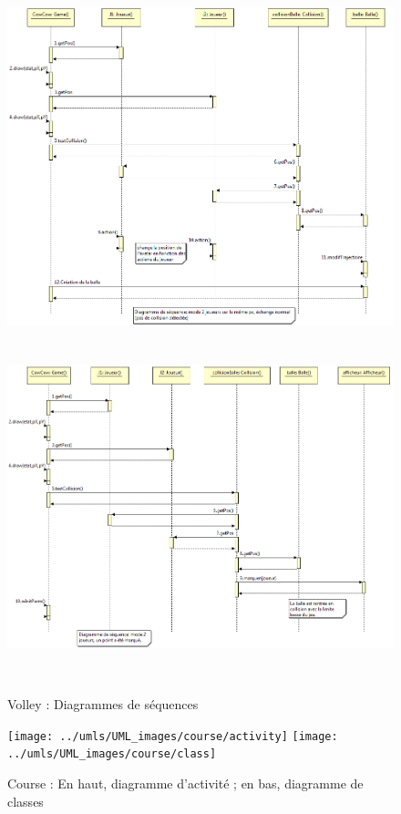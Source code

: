 \begin{figure}[h]
 \centering
 \includegraphics[height=9.5cm]{../umls/UML_images/Volley/sequence} \hfill
 \includegraphics[height=10cm]{../umls/UML_images/Volley/sequence2} \hfill
 \caption{Volley : Diagrammes de séquences}
\end{figure}


\clearpage

\begin{figure}[h]
 \centering
 \texttt{[image: ../umls/UML\_images/course/activity]} \hfill
 \texttt{[image: ../umls/UML\_images/course/class]} \hfill
 \caption{Course : En haut, diagramme d'activité ; en bas, diagramme de classes}
\end{figure}

